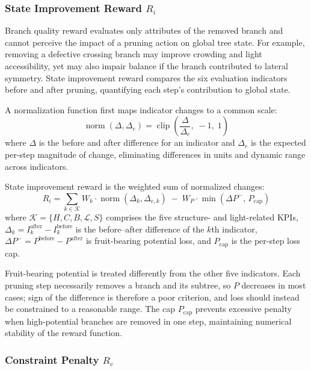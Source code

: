 \documentclass[12pt,a4paper,fontset=fandol]{ctexart}
\begin{document}
\subsubsection{State Improvement Reward $R_i$}

Branch quality reward evaluates only attributes of the removed branch
and cannot perceive the impact of a pruning action on global tree state.
For example, removing a defective crossing branch may improve crowding and light accessibility,
yet may also impair balance if the branch contributed to lateral symmetry.
State improvement reward compares the six evaluation indicators before and after pruning,
quantifying each step's contribution to global state.

A normalization function first maps indicator changes to a common scale:
\begin{equation}\label{eq:normalize}
  \operatorname{norm}(\Delta, \Delta_e) = \operatorname{clip}\!\left(\frac{\Delta}{\Delta_e},\; -1,\; 1\right)
\end{equation}
where $\Delta$ is the before and after difference for an indicator
and $\Delta_e$ is the expected per-step magnitude of change,
eliminating differences in units and dynamic range across indicators.

State improvement reward is the weighted sum of normalized changes:
\begin{equation}\label{eq:state_improve}
  R_i = \sum_{k \in \mathcal{K}} W_k \cdot \operatorname{norm}\!\left(\Delta_k, \Delta_{e,k}\right)
  \;-\; W_P \cdot \min\!\left(\Delta P^{-}, \, P_{\text{cap}}\right)
\end{equation}
where $\mathcal{K} = \{H, C, B, \mathcal{L}, S\}$ comprises the five structure- and light-related KPIs,
$\Delta_k = I_k^{\mathrm{after}} - I_k^{\mathrm{before}}$ is the before--after difference of the $k$th indicator,
$\Delta P^{-} = P^{\mathrm{before}} - P^{\mathrm{after}}$ is fruit-bearing potential loss, and $P_{\text{cap}}$ is the per-step loss cap.

Fruit-bearing potential is treated differently from the other five indicators.
Each pruning step necessarily removes a branch and its subtree,
so $P$ decreases in most cases;
sign of the difference is therefore a poor criterion,
and loss should instead be constrained to a reasonable range.
The cap $P_{\text{cap}}$ prevents excessive penalty when high-potential branches are removed in one step,
maintaining numerical stability of the reward function.

\subsubsection{Constraint Penalty $R_c$}
\end{document}
